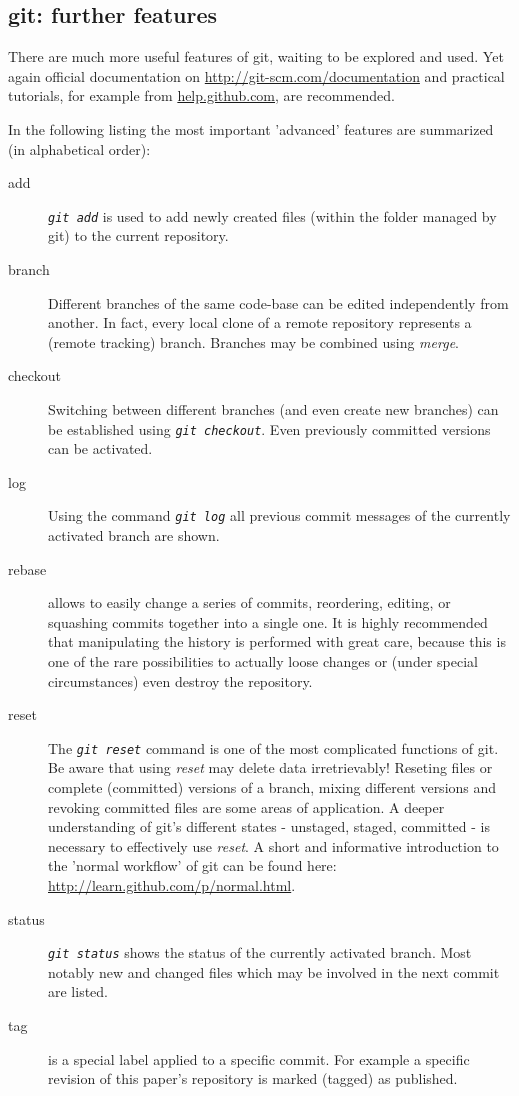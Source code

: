 \documentclass{ifacconf}
\begin{document}
\subsection{git: further features}
There are much more useful features of git, waiting to be explored and used. Yet again
official documentation on \url{http://git-scm.com/documentation} and practical
tutorials, for example from \url{help.github.com}, are recommended.

In the following listing the most important 'advanced' features are summarized
(in alphabetical order):
\begin{description}
\item [add] \textit{\lstinline!git add!} is used to add newly created files (within the  folder managed by git) to the current repository.
\item [{branch}] Different branches of the same code-base can be edited independently from
another. In fact, every local clone of a remote repository represents a (remote tracking) 
branch. Branches may be combined using \textit{merge}.
\item [checkout] Switching between different branches (and even create new branches) can
be established using \textit{\lstinline!git checkout!}. Even previously committed versions
can be activated.
\item [log] Using the command \textit{\lstinline!git log!} all previous commit messages of
the currently activated branch are shown.
\item [{rebase}] allows to easily change a series of commits, reordering, editing, or squashing commits together into a single one. 
It is highly recommended that manipulating the history is performed with great care, because this is one of the 
rare possibilities to actually loose changes or (under special circumstances) even destroy the repository.
\item [reset] The \textit{\lstinline!git reset!} command is one of the most complicated
functions of git. Be aware that using \textit{reset} may delete data
irretrievably! Reseting files or complete (committed) versions
of a branch, mixing different versions and revoking committed files are some areas of application. 
A deeper understanding of git's different states -
unstaged, staged, committed - is necessary to effectively use \textit{reset}. A short
and informative introduction to the 'normal workflow' of git can be found here: \url{http://learn.github.com/p/normal.html}.
\item [status] \textit{\lstinline!git status!} shows the status of
the currently activated branch. Most notably new and changed files which may be involved
in the next commit are listed.
\item [tag] is a special label applied to a specific commit. For example a specific revision
of this paper's repository is marked (tagged) as published.
\end{description}
\end{document}
